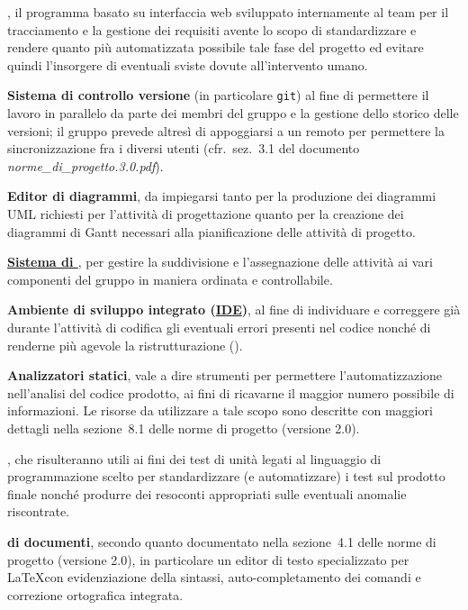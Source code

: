 \begin{description}
\item{\bfseries \manager}, il programma basato su interfaccia web sviluppato internamente al team per il tracciamento e la gestione dei requisiti avente lo scopo di standardizzare e rendere quanto più automatizzata possibile tale fase del progetto ed evitare quindi l'insorgere di eventuali sviste dovute all'intervento umano.

\item{\bfseries Sistema di controllo versione} (in particolare \texttt{git}) al fine di permettere il lavoro in parallelo da parte dei membri del gruppo e la gestione dello storico delle versioni; il gruppo prevede altresì di appoggiarsi a un \underline{} remoto per permettere la sincronizzazione fra i diversi utenti (cfr.~sez.~3.1 del documento \textit{norme\_di\_progetto.3.0.pdf}). 

\item{\bfseries Editor di diagrammi}, da impiegarsi tanto per la produzione dei diagrammi UML richiesti per l'attività di progettazione quanto per la creazione dei diagrammi di Gantt necessari alla pianificazione delle attività di progetto. 

\item{\bfseries \underline{Sistema di }}, per gestire la suddivisione e l'assegnazione delle attività ai vari componenti del gruppo in maniera ordinata e controllabile.

\item{\bfseries Ambiente di sviluppo integrato (\underline{IDE})}, al fine di individuare e correggere già durante l'attività di codifica gli eventuali errori presenti nel codice nonché di renderne più agevole la ristrutturazione ().

\item{\bfseries Analizzatori statici}, vale a dire strumenti per permettere l'automatizzazione nell'analisi del codice prodotto, ai fini di ricavarne il maggior numero possibile di informazioni. Le risorse da utilizzare a tale scopo sono descritte con maggiori dettagli nella sezione~8.1 delle norme di progetto (versione 2.0).

\item{\bfseries {}}, che risulteranno utili ai fini dei test di unità legati al linguaggio di programmazione scelto per standardizzare (e automatizzare) i test sul prodotto finale nonché produrre dei resoconti appropriati sulle eventuali anomalie riscontrate.

\item{\bfseries {} di documenti}, secondo quanto documentato nella sezione~4.1 delle norme di progetto (versione 2.0), in particolare un editor di testo specializzato per \LaTeX con evidenziazione della sintassi, auto-completamento dei comandi e correzione ortografica integrata. 
\end{description}

